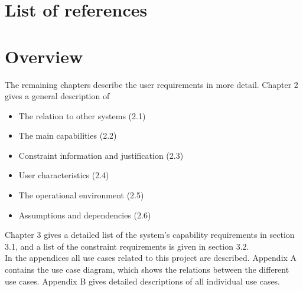 \section{List of references}





\section{Overview}

The remaining chapters describe the user requirements in more detail. Chapter 2 gives a general description of
\begin{itemize}
\item The relation to other systems (2.1)
\item The main capabilities (2.2)
\item Constraint information and justification (2.3)
\item User characteristics (2.4)
\item The operational environment (2.5)
\item Assumptions and dependencies (2.6)
\end{itemize}

Chapter 3 gives a detailed list of the system's capability requirements in section 3.1, and a list of the constraint requirements is given in section 3.2.\\
In the appendices all use cases related to this project are described. Appendix A contains the use case diagram, which shows the relations between the different use cases. Appendix B gives detailed descriptions of all individual use cases.
